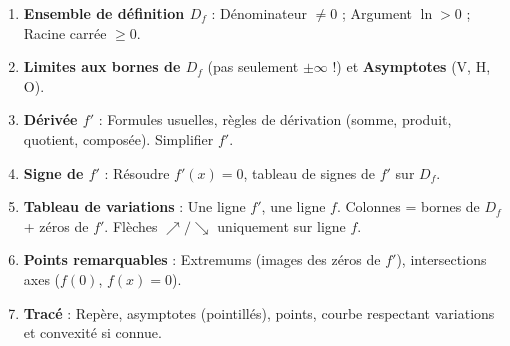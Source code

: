 \documentclass[11pt]{article}
\begin{document}
\begin{methode}
\begin{enumerate}
  \item \textbf{Ensemble de définition $D_f$} : Dénominateur $\neq 0$ ; Argument $\ln > 0$ ; Racine carrée $\geq 0$.
  \item \textbf{Limites aux bornes de $D_f$} (pas seulement $\pm\infty$ !) et \textbf{Asymptotes} (V, H, O).
  \item \textbf{Dérivée $f'$} : Formules usuelles, règles de dérivation (somme, produit, quotient, composée). Simplifier $f'$.
  \item \textbf{Signe de $f'$} : Résoudre $f'(x)=0$, tableau de signes de $f'$ sur $D_f$.
  \item \textbf{Tableau de variations} : Une ligne $f'$, une ligne $f$. Colonnes = bornes de $D_f$ + zéros de $f'$. Flèches $\nearrow/\searrow$ uniquement sur ligne $f$.
  \item \textbf{Points remarquables} : Extremums (images des zéros de $f'$), intersections axes ($f(0)$, $f(x)=0$).
  \item \textbf{Tracé} : Repère, asymptotes (pointillés), points, courbe respectant variations et convexité si connue.
\end{enumerate}
\end{methode}
\end{document}
